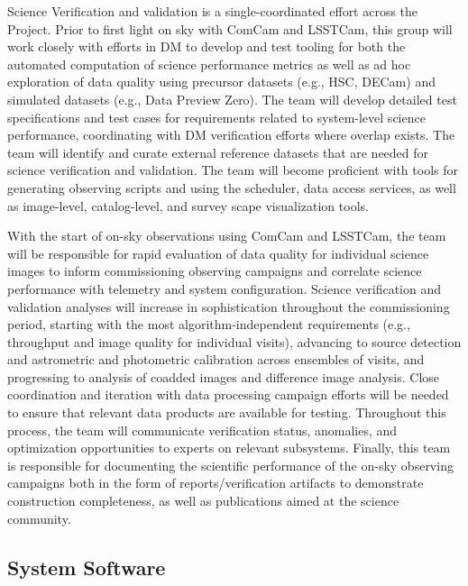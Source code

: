 \documentclass[SE,toc]{lsstdoc}
\begin{document}
Science Verification and validation is a single-coordinated effort across the Project.
Prior to first light on sky with ComCam and LSSTCam, this group will work closely with efforts in DM to develop and test tooling for both the automated computation of science performance metrics as well as ad hoc exploration of data quality using precursor datasets (e.g., HSC, DECam) and simulated datasets (e.g., Data Preview Zero).
The team will develop detailed test specifications and test cases for requirements related to system-level science performance, coordinating with DM verification efforts where overlap exists.
The team will identify and curate external reference datasets that are needed for science verification and validation.
The team will become proficient with tools for generating observing scripts and using the scheduler, data access services, as well as image-level, catalog-level, and survey scape visualization tools.

With the start of on-sky observations using ComCam and LSSTCam, the team will be responsible for rapid evaluation of data quality for individual science images to inform commissioning observing campaigns and correlate science performance with telemetry and system configuration.
Science verification and validation analyses will increase in sophistication throughout the commissioning period, starting with the most algorithm-independent requirements (e.g., throughput and image quality for individual visits), advancing to source detection and astrometric and photometric calibration across ensembles of visits, and progressing to analysis of coadded images and difference image analysis.
Close coordination and iteration with data processing campaign efforts will be needed to ensure that relevant data products are available for testing.
Throughout this process, the team will communicate verification status, anomalies, and optimization opportunities to experts on relevant subsystems.
Finally, this team is responsible for documenting the scientific performance of the on-sky observing campaigns both in the form of reports/verification artifacts to demonstrate construction completeness, as well as publications aimed at the science community.

\subsection{System Software}
\end{document}

